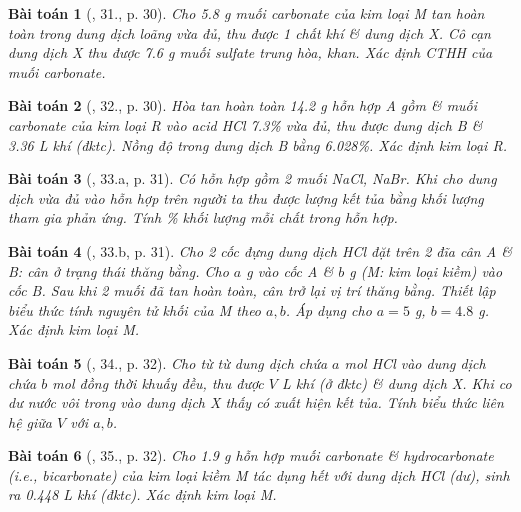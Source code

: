 \documentclass{article}
\newtheorem{baitoan}{Bài toán}
\begin{document}
\begin{baitoan}[\cite{An_350_BT_Hoa_Hoc_9}, 31., p. 30]
	Cho \emph{5.8 g} muối carbonate \emph{} của kim loại M tan hoàn toàn trong dung dịch \emph{} loãng vừa đủ, thu được 1 chất khí \& dung dịch X. Cô cạn dung dịch X thu được \emph{7.6 g} muối sulfate trung hòa, khan. Xác định CTHH của muối carbonate.
\end{baitoan}

\begin{baitoan}[\cite{An_350_BT_Hoa_Hoc_9}, 32., p. 30]
	Hòa tan hoàn toàn \emph{14.2 g} hỗn hợp A gồm \emph{} \& muối carbonate của kim loại R vào acid \emph{HCl 7.3\%} vừa đủ, thu được dung dịch B \& \emph{3.36 L} khí \emph{} (đktc). Nồng độ \emph{} trong dung dịch B bằng \emph{6.028\%}. Xác định kim loại R.
\end{baitoan}

\begin{baitoan}[\cite{An_350_BT_Hoa_Hoc_9}, 33.a, p. 31]
	Có hỗn hợp gồm 2 muối \emph{NaCl, NaBr}. Khi cho dung dịch \emph{} vừa đủ vào hỗn hợp trên người ta thu được lượng kết tủa bằng khối lượng \emph{} tham gia phản ứng. Tính \% khối lượng mỗi chất trong hỗn hợp.
\end{baitoan}

\begin{baitoan}[\cite{An_350_BT_Hoa_Hoc_9}, 33.b, p. 31]
	Cho 2 cốc đựng dung dịch \emph{HCl} đặt trên 2 đĩa cân A \& B: cân ở trạng thái thăng bằng. Cho $a$ \emph{g } vào cốc A \& $b$ \emph{g } (M: kim loại kiềm) vào cốc B. Sau khi 2 muối đã tan hoàn toàn, cân trở lại vị trí thăng bằng. Thiết lập biểu thức tính nguyên tử khối của M theo $a,b$. Áp dụng cho $a = 5$ \emph{g}, $b = 4.8$ \emph{g}. Xác định kim loại M.
\end{baitoan}

\begin{baitoan}[\cite{An_350_BT_Hoa_Hoc_9}, 34., p. 32]
	Cho từ từ dung dịch chứa $a$ \emph{mol HCl} vào dung dịch chứa $b$ \emph{mol } đồng thời khuấy đều, thu được $V$ \emph{L} khí (ở đktc) \& dung dịch X. Khi co dư nước vôi trong vào dung dịch X thấy có xuất hiện kết tủa. Tính biểu thức liên hệ giữa $V$ với $a,b$.
\end{baitoan}

\begin{baitoan}[\cite{An_350_BT_Hoa_Hoc_9}, 35., p. 32]
	Cho \emph{1.9 g} hỗn hợp muối carbonate \& hydrocarbonate (i.e., bicarbonate) của kim loại kiềm M tác dụng hết với dung dịch \emph{HCl} (dư), sinh ra \emph{0.448 L} khí (đktc). Xác định kim loại M.
\end{baitoan}
\end{document}
